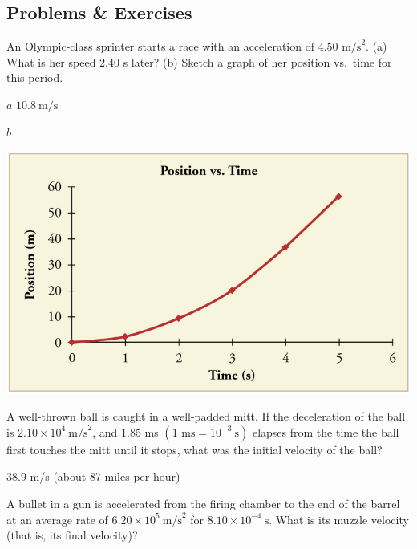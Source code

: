 \documentclass[
]{book}
\newenvironment{problems-exercises}{}{}
\begin{document}
\hypertarget{fs-id1164906440394}{}
\begin{problems-exercises}

\hypertarget{problems-exercises-3}{%
\subsection{Problems \& Exercises}\label{problems-exercises-3}}

\hypertarget{fs-id1164906440403}{}
\leavevmode\hypertarget{fs-id1164906435871}{}%
An Olympic-class sprinter starts a race with an acceleration of
\({4\text{.}\text{50\ m/s}^{2}}{}\). (a) What is her speed 2.40 s later?
(b) Sketch a graph of her position vs.~time for this period.

\leavevmode\hypertarget{fs-id1164906440054}{}%
\(a\) \({\text{10}\text{.}8\ \text{m/s}}{}\)

\(b\)

\includegraphics{images/unnumbered_art_p44.jpg}

\hypertarget{fs-id1164906478917}{}
\leavevmode\hypertarget{fs-id1164906478920}{}%
A well-thrown ball is caught in a well-padded mitt. If the deceleration
of the ball is
\({2\text{.}\text{10} \times \text{10}^{4}\ \text{m/s}^{2}}{}\), and 1.85
ms \({({\text{1\ ms} = \text{10}^{- 3}}\ \text{s})}{}\) elapses from the
time the ball first touches the mitt until it stops, what was the
initial velocity of the ball?

\leavevmode\hypertarget{fs-id1164906499124}{}%
38.9 m/s (about 87 miles per hour)

\hypertarget{fs-id1164906452216}{}
\leavevmode\hypertarget{fs-id1164906452219}{}%
A bullet in a gun is accelerated from the firing chamber to the end of
the barrel at an average rate of
\({6\text{.20} \times \text{10}^{5}\ \text{m/s}^{2}}{}\) for
\({8\text{.}\text{10} \times \text{10}^{- 4}\ \text{s}}{}\). What is its
muzzle velocity (that is, its final velocity)?


\end{problems-exercises}
\end{document}
